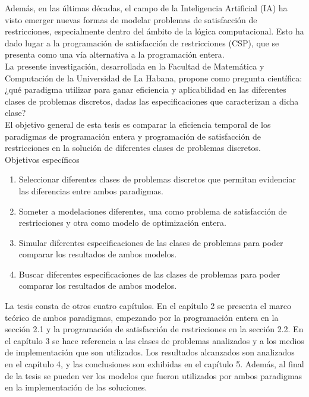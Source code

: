 \documentclass[12pt]{report}
\begin{document}
Además, en las últimas décadas, el campo de la Inteligencia Artificial (IA) ha visto emerger nuevas formas de modelar problemas de satisfacción de restricciones, especialmente dentro del ámbito de la lógica computacional. Esto ha dado lugar a la programación de satisfacción de restricciones (CSP), que se presenta como una vía alternativa a la programación entera.  \\

La presente investigación, desarrollada en la Facultad de Matemática y Computación de la Universidad de La Habana, propone como pregunta científica: ¿qué paradigma utilizar para ganar eficiencia y aplicabilidad en las diferentes clases de problemas discretos, dadas las especificaciones que caracterizan a dicha clase?  \\

El objetivo general de esta tesis es comparar la eficiencia temporal de los paradigmas de programación entera y programación de satisfacción de restricciones en la solución de diferentes clases de problemas discretos. \\


Objetivos específicos
\begin{enumerate}
\item Seleccionar diferentes clases de problemas discretos que permitan evidenciar las diferencias entre ambos paradigmas.
\item Someter a modelaciones diferentes, una como problema de satisfacción de restricciones y otra como modelo de optimización entera.
\item Simular diferentes especificaciones de las clases de problemas para poder comparar los resultados de ambos modelos.
\item Buscar diferentes especificaciones de las clases de problemas para poder comparar los resultados de ambos modelos.\\
\end{enumerate}

La tesis consta de otros cuatro capítulos. En el capítulo 2 se presenta el marco teórico de ambos paradigmas, empezando por la programación entera en la sección 2.1 y la programación de satisfacción de restricciones en la sección 2.2. En el capítulo 3 se hace referencia a las clases de problemas analizados y a los medios de implementación que son utilizados. Los resultados alcanzados son analizados en el capítulo 4, y las conclusiones son exhibidas en el capítulo 5. Además, al final de la tesis se pueden ver los modelos que fueron utilizados por ambos paradigmas en la implementación de las soluciones.\\
\end{document}
